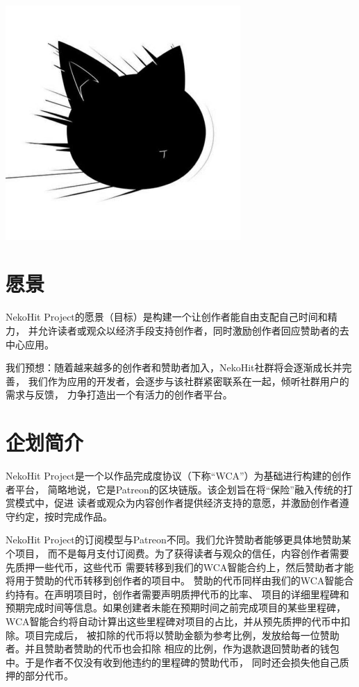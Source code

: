 \documentclass[11pt,UTF8,a4paper]{ctexart}
\begin{document}
    \tableofcontents
    \vspace*{\fill}
    \begin{center}
        \includegraphics[width=0.67\textwidth]{assets/img197}
    \end{center}
    \clearpage



    \section{愿景}\label{sec:goal}

    NekoHit Project的愿景（目标）是构建一个让创作者能自由支配自己时间和精力，
    并允许读者或观众以经济手段支持创作者，同时激励创作者回应赞助者的去中心应用。

    我们预想：随着越来越多的创作者和赞助者加入，NekoHit社群将会逐渐成长并完善，
    我们作为应用的开发者，会逐步与该社群紧密联系在一起，倾听社群用户的需求与反馈，
    力争打造出一个有活力的创作者平台。


    \section{企划简介}\label{sec:intro}

    NekoHit Project是一个以作品完成度协议（下称“WCA”）为基础进行构建的创作者平台，
    简略地说，它是Patreon的区块链版。该企划旨在将“保险”融入传统的打赏模式中，促进
    读者或观众为内容创作者提供经济支持的意愿，并激励创作者遵守约定，按时完成作品。

    NekoHit Project的订阅模型与Patreon不同。我们允许赞助者能够更具体地赞助某个项目，
    而不是每月支付订阅费。为了获得读者与观众的信任，内容创作者需要先质押一些代币，这些代币
    需要转移到我们的WCA智能合约上，然后赞助者才能将用于赞助的代币转移到创作者的项目中。
    赞助的代币同样由我们的WCA智能合约持有。在声明项目时，创作者需要声明质押代币的比率、
    项目的详细里程碑和预期完成时间等信息。如果创建者未能在预期时间之前完成项目的某些里程碑，
    WCA智能合约将自动计算出这些里程碑对项目的占比，并从预先质押的代币中扣除。项目完成后，
    被扣除的代币将以赞助金额为参考比例，发放给每一位赞助者。并且赞助者赞助的代币也会扣除
    相应的比例，作为退款退回赞助者的钱包中。于是作者不仅没有收到他违约的里程碑的赞助代币，
    同时还会损失他自己质押的部分代币。
\end{document}
